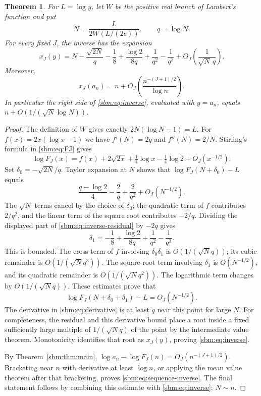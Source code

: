 \documentclass[11pt,letterpaper]{article}
\numberwithin{equation}{section}
\newtheorem{theorem}{Theorem}[section]
\theoremstyle{remark}\newtheorem{remark}[theorem]{Remark}
\begin{document}
\begin{theorem}\label{sbm:thm:smooth-inverse}
For $L=\log y$, let $W$ be the positive real branch of Lambert's
function and put
\begin{equation}\label{sbm:eq:N}
 N=\frac{L}{2W(L/(2e))},\qquad q=\log N.
\end{equation}
For every fixed $J$, the inverse has the expansion
\begin{equation}\label{sbm:eq:inverse}
 x_J(y)=N-\frac{\sqrt{2N}}q-\frac18+
             \frac{\log2}{8q}+\frac1{q^2}-\frac1{q^3}
             +O_J\left(\frac1{\sqrt N\,q}\right).
\end{equation}
Moreover,
\begin{equation}\label{sbm:eq:sequence-inverse}
 x_J(a_n)=n+O_J\left(\frac{n^{-(J+1)/2}}{\log n}\right).
\end{equation}
In particular the right side of \eqref{sbm:eq:inverse}, evaluated with
$y=a_n$, equals $n+O(1/(\sqrt{N}\log N))$.
\end{theorem}
\begin{proof}
The definition of $W$ gives exactly $2N(\log N-1)=L$.
For $f(x)=2x(\log x-1)$ we have $f'(N)=2q$ and $f''(N)=2/N$.
Stirling's formula in \eqref{sbm:eq:FJ} gives
\[
 \log F_J(x)=f(x)+2\sqrt{2x}
                  +\tfrac14\log x-\tfrac14\log2+O_J(x^{-1/2}).
\]
Set $\delta_0=-\sqrt{2N}/q$. Taylor expansion at $N$ shows that
$\log F_J(N+\delta_0)-L$ equals
\begin{equation}\label{sbm:eq:inverse-residual}
 \frac{q-\log2}{4}-\frac2q+\frac2{q^2}+O_J(N^{-1/2}).
\end{equation}
The $\sqrt N$ terms cancel by the choice of $\delta_0$; the quadratic
term of $f$ contributes $2/q^2$, and the linear term of the square
root contributes $-2/q$.
Dividing the displayed part of \eqref{sbm:eq:inverse-residual} by $-2q$
gives
\[
 \delta_1=-\frac18+\frac{\log2}{8q}+\frac1{q^2}-\frac1{q^3}.
\]
This is bounded. The cross term of $f$ involving $\delta_0\delta_1$
is $O(1/(\sqrt N q))$; its cubic remainder is
$O(1/(\sqrt Nq^3))$. The square-root term involving $\delta_1$ is
$O(N^{-1/2})$, and its quadratic remainder is
$O(1/(\sqrt Nq^2))$. The logarithmic term changes by
$O(1/(\sqrt Nq))$. These estimates prove that
\[
 \log F_J(N+\delta_0+\delta_1)-L=O_J(N^{-1/2}).
\]
The derivative in \eqref{sbm:eq:derivative} is at least $q$ near this point
for large $N$. For completeness, the residual and this derivative
bound place a root inside a fixed sufficiently large multiple of
$1/(\sqrt Nq)$ of the point by the intermediate value theorem.
Monotonicity identifies that root as $x_J(y)$, proving
\eqref{sbm:eq:inverse}.

By Theorem~\ref{sbm:thm:main},
$\log a_n-\log F_J(n)=O_J(n^{-(J+1)/2})$.
Bracketing near $n$ with derivative at least $\log n$, or applying
the mean value theorem after that bracketing, proves
\eqref{sbm:eq:sequence-inverse}. The final statement follows by combining
this estimate with \eqref{sbm:eq:inverse}; $N\sim n$.
\end{proof}
\end{document}
